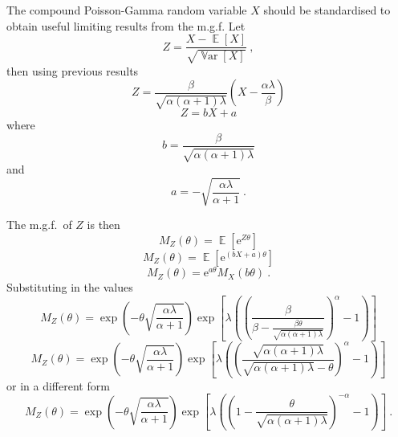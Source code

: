 \documentclass[12pt, a4paper]{memoir}
\DeclareMathOperator{\expectation}{\mathbb{E}}
\DeclareMathOperator{\variance}{\mathbb{V}ar}
\newcommand{\euler}{\mathrm{e}}
\begin{document}
The compound Poisson-Gamma random variable $X$ should be standardised to obtain useful limiting results from the m.g.f. Let
\begin{equation}
	Z = \frac{X-\expectation[X]}{\sqrt{\variance[X]}}
	\ ,
\end{equation}
then using previous results
\begin{equation*}
	Z = \frac{\beta}{\sqrt{\alpha(\alpha+1)\lambda}}
	\left(
		X-\frac{\alpha\lambda}{\beta}
	\right)
\end{equation*}
\begin{equation}
	Z = bX+a
\end{equation}
where
\begin{equation}
	b = \frac{\beta}{\sqrt{\alpha(\alpha+1)\lambda}}
\end{equation}
and
\begin{equation}
	a = -\sqrt{\frac{\alpha\lambda}{\alpha+1}}
	\ .
\end{equation}

The m.g.f.~of $Z$ is then
\begin{equation*}
	M_Z(\theta)=\expectation\left[\euler^{Z\theta}\right]
\end{equation*}
\begin{equation*}
	M_Z(\theta)=\expectation\left[\euler^{(bX+a)\theta}\right]
\end{equation*}
\begin{equation*}
	M_Z(\theta)=\euler^{a\theta}M_X(b\theta)
	\ .
\end{equation*}
Substituting in the values
\begin{equation*}
	M_Z(\theta)=
	\exp\left(
	    -\theta\sqrt{\frac{\alpha\lambda}{\alpha+1}}
    \right)
	\exp\left[
		\lambda
		\left(
			\left(
				\frac{\beta}{\beta-\frac{\beta\theta}{\sqrt{\alpha(\alpha+1)\lambda}}}
			\right)^\alpha
			-1
		\right)
	\right]
\end{equation*}
\begin{equation*}
	M_Z(\theta)=
	\exp\left(
	    -\theta\sqrt{\frac{\alpha\lambda}{\alpha+1}}
    \right)
	\exp\left[
		\lambda
		\left(
			\left(
				\frac{\sqrt{\alpha(\alpha+1)\lambda}}{\sqrt{\alpha(\alpha+1)\lambda}-\theta}
			\right)^\alpha
			-1
		\right)
	\right]
\end{equation*}
or in a different form
\begin{equation}
	M_Z(\theta)=
	\exp\left(
	    -\theta\sqrt{\frac{\alpha\lambda}{\alpha+1}}
    \right)
	\exp\left[
		\lambda
		\left(
			\left(
				1-\frac{\theta}{\sqrt{\alpha(\alpha+1)\lambda}}	
			\right)^{-\alpha}
			-1
		\right)
	\right]
	\ .
\end{equation}
\end{document}
